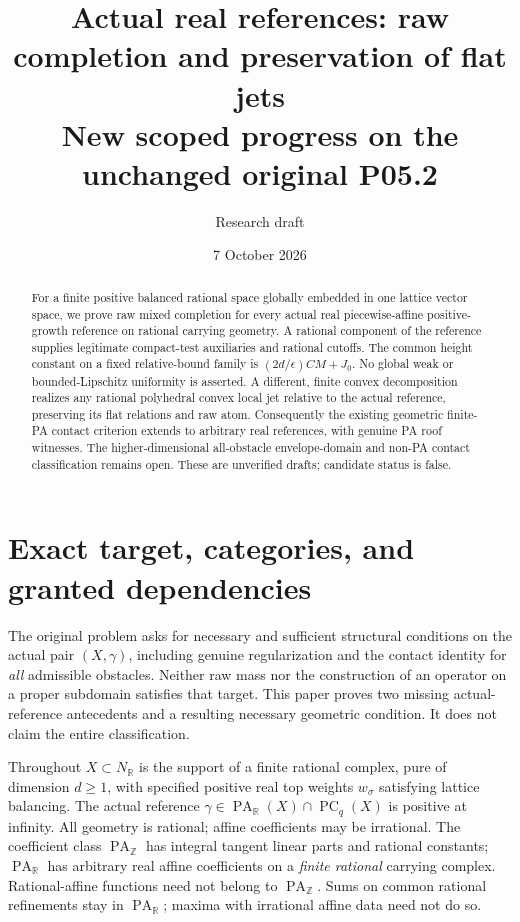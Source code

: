 \documentclass[11pt]{article}
\title{Actual real references: raw completion and preservation of flat jets\\
\large New scoped progress on the unchanged original P05.2}
\author{Research draft}
\date{7 October 2026}
\newcommand{\R}{\mathbb R}
\newcommand{\Z}{\mathbb Z}
\newcommand{\PA}{\operatorname{PA}}
\newcommand{\PC}{\operatorname{PC}}
\begin{document}
\maketitle
\begin{abstract}
For a finite positive balanced rational space globally embedded in one
lattice vector space, we prove raw mixed completion for every actual real
piecewise-affine positive-growth reference on rational carrying geometry.
A rational component of the reference supplies legitimate compact-test
auxiliaries and rational cutoffs. The common height constant on a fixed
relative-bound family is $(2d/\epsilon)CM+J_0$. No global weak or
bounded-Lipschitz uniformity is asserted. A different, finite convex
decomposition realizes any rational polyhedral convex local jet relative
to the actual reference, preserving its flat relations and raw atom.
Consequently the existing geometric finite-PA contact criterion extends
to arbitrary real references, with genuine PA roof witnesses. The
higher-dimensional all-obstacle envelope-domain and non-PA contact
classification remains open. These are unverified drafts;
candidate status is false.
\end{abstract}

\section{Exact target, categories, and granted dependencies}
The original problem asks for necessary and sufficient structural
conditions on the actual pair $(X,\gamma)$, including genuine
regularization and the contact identity for \emph{all} admissible
obstacles. Neither raw mass nor the construction of an operator on a
proper subdomain satisfies that target. This paper proves two missing
actual-reference antecedents and a resulting necessary geometric
condition. It does not claim the entire classification.

Throughout $X\subset N_\R$ is the support of a finite rational complex,
pure of dimension $d\geq1$, with specified positive real top weights
$w_\sigma$ satisfying lattice balancing. The actual reference
$\gamma\in\PA_\R(X)\cap\PC_q(X)$ is positive at infinity. All geometry
is rational; affine coefficients may be irrational. The coefficient
class $\PA_\Z$ has integral tangent linear parts and rational constants;
$\PA_\R$ has arbitrary real affine coefficients on a \emph{finite
rational} carrying complex. Rational-affine functions need not belong
to $\PA_\Z$. Sums on common rational refinements stay in $\PA_\R$;
maxima with irrational affine data need not do so.
\end{document}
